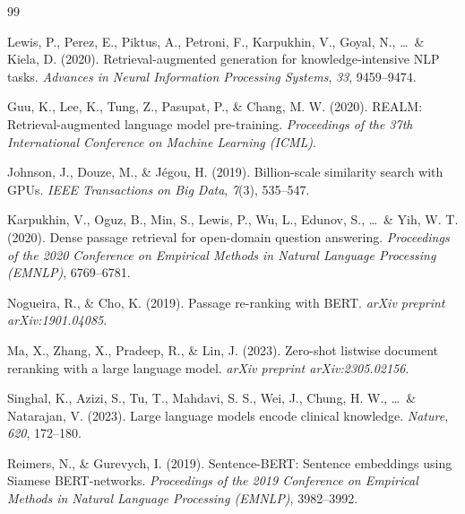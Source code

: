 \documentclass[12pt, letterpaper]{article}
\begin{document}
\newpage


\begin{thebibliography}{99}

  Lewis, P., Perez, E., Piktus, A., Petroni, F., Karpukhin, V., Goyal, N., \ldots\ \& Kiela, D. (2020).
  Retrieval-augmented generation for knowledge-intensive NLP tasks.
  \textit{Advances in Neural Information Processing Systems}, \textit{33}, 9459--9474.

  Guu, K., Lee, K., Tung, Z., Pasupat, P., \& Chang, M. W. (2020).
  REALM: Retrieval-augmented language model pre-training.
  \textit{Proceedings of the 37th International Conference on Machine Learning (ICML)}.

  Johnson, J., Douze, M., \& Jégou, H. (2019).
  Billion-scale similarity search with GPUs.
  \textit{IEEE Transactions on Big Data}, \textit{7}(3), 535--547.

  Karpukhin, V., Oguz, B., Min, S., Lewis, P., Wu, L., Edunov, S., \ldots\ \& Yih, W. T. (2020).
  Dense passage retrieval for open-domain question answering.
  \textit{Proceedings of the 2020 Conference on Empirical Methods in Natural Language Processing (EMNLP)}, 6769--6781.

  Nogueira, R., \& Cho, K. (2019).
  Passage re-ranking with BERT.
  \textit{arXiv preprint arXiv:1901.04085}.

  Ma, X., Zhang, X., Pradeep, R., \& Lin, J. (2023).
  Zero-shot listwise document reranking with a large language model.
  \textit{arXiv preprint arXiv:2305.02156}.

  Singhal, K., Azizi, S., Tu, T., Mahdavi, S. S., Wei, J., Chung, H. W., \ldots\ \& Natarajan, V. (2023).
  Large language models encode clinical knowledge.
  \textit{Nature}, \textit{620}, 172--180.

  Reimers, N., \& Gurevych, I. (2019).
  Sentence-BERT: Sentence embeddings using Siamese BERT-networks.
  \textit{Proceedings of the 2019 Conference on Empirical Methods in Natural Language Processing (EMNLP)}, 3982--3992.

\end{thebibliography}
\end{document}
